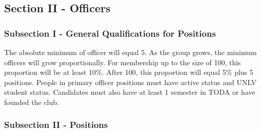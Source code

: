 \documentclass[11pt]{article}
\begin{document}
\subsection{Section II - Officers}
\label{sec:org6aae499}


\subsubsection{Subsection I - General Qualifications for Positions}
\label{sec:org4a29d12}

The absolute minimum of officer will equal 5. 
As the group grows, the minimum officers will grow proportionally. 
For membership up to the size of 100, this proportion will be at least 10\%. 
After 100, this proportion will equal 5\% plus 5 positions. 
People in primary officer positions must have active status and UNLV student status. 
Candidates must also have at least 1 semester in TODA or have founded the club.

\subsubsection{Subsection II - Positions}
\label{sec:org18ce44b}
\end{document}

